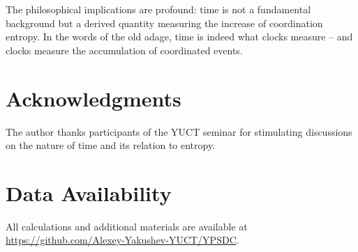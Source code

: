 \documentclass[12pt,a4paper]{article}
\begin{document}
	The philosophical implications are profound: time is not a fundamental background but a derived quantity measuring the increase of coordination entropy. In the words of the old adage, time is indeed what clocks measure – and clocks measure the accumulation of coordinated events.
	
	\section*{Acknowledgments}
	
	The author thanks participants of the YUCT seminar for stimulating discussions on the nature of time and its relation to entropy.
	
	\section*{Data Availability}
	
	All calculations and additional materials are available at \url{https://github.com/Alexey-Yakushev-YUCT/YPSDC}.
	
\end{document}
